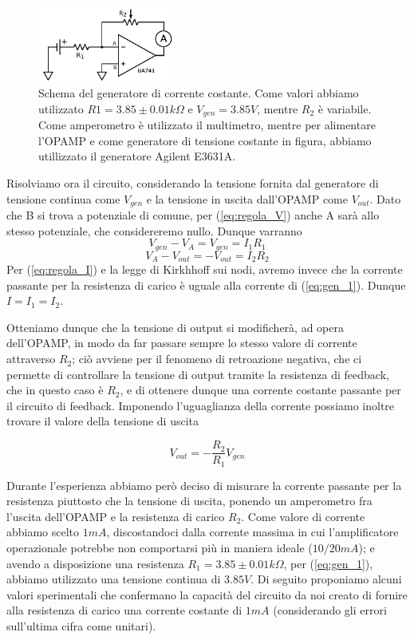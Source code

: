 \begin{figure}
  \begin{center}
    \includegraphics[width=0.40\textwidth]{../E01/latex/c1.pdf}
  \end{center}
  \caption{Schema del generatore di corrente costante. Come valori abbiamo utilizzato $R1=3.85 \pm 0.01 k\Omega$ e $V_{gen}=3.85 V$, mentre $R_2$ è variabile. Come amperometro è utilizzato il multimetro, mentre per alimentare l'OPAMP e come generatore di tensione costante in figura, abbiamo utillizzato il generatore Agilent E3631A.}
  \label{gen_continua}
\end{figure}

Risolviamo ora il circuito, considerando la tensione fornita dal generatore di tensione continua come $V_{gen}$ e la tensione in uscita dall'OPAMP come $V_{out}$. Dato che B si trova a potenziale di comune, per (\ref{eq:regola_V}) anche A sarà allo stesso potenziale, che considereremo nullo. Dunque varranno
\begin{equation}
V_{gen} - V_A = V_{gen} = I_1 R_1
\label{eq:gen_1}
\end{equation}
$$V_A-V_{out} = -V_{out} = I_2 R_2$$
Per (\ref{eq:regola_I}) e la legge di Kirkhhoff sui nodi, avremo invece che la corrente passante per la resistenza di carico è uguale alla corrente di (\ref{eq:gen_1}). Dunque $I=I_1=I_2$.

Otteniamo dunque che la tensione di output si modificherà, ad opera dell'OPAMP, in modo da far passare sempre lo stesso valore di corrente attraverso $R_2$; ciò avviene per il fenomeno di retroazione negativa, che ci permette di controllare la tensione di output tramite la resistenza di feedback, che in questo caso è $R_2$, e di ottenere dunque una corrente costante passante per il circuito di feedback. Imponendo l'uguaglianza della corrente possiamo inoltre trovare il valore della tensione di uscita

$$V_{out}=-\frac{R_2}{R_1} V_{gen}$$

Durante l'esperienza abbiamo però deciso di misurare la corrente passante per la resistenza piuttosto che la tensione di uscita, ponendo un amperometro fra l'uscita dell'OPAMP e la resistenza di carico $R_2$. Come valore di corrente abbiamo scelto $1 mA$, discostandoci dalla corrente massima in cui l'amplificatore operazionale potrebbe non comportarsi più in maniera ideale ($10/20 mA$); e avendo a disposizione una resistenza $R_1=3.85 \pm 0.01 k\Omega$, per (\ref{eq:gen_1}), abbiamo utilizzato una tensione continua di $3.85 V$. Di seguito proponiamo alcuni valori sperimentali che confermano la capacità del circuito da noi creato di fornire alla resistenza di carico una corrente costante di $1 mA$ (considerando gli errori sull'ultima cifra come unitari).

